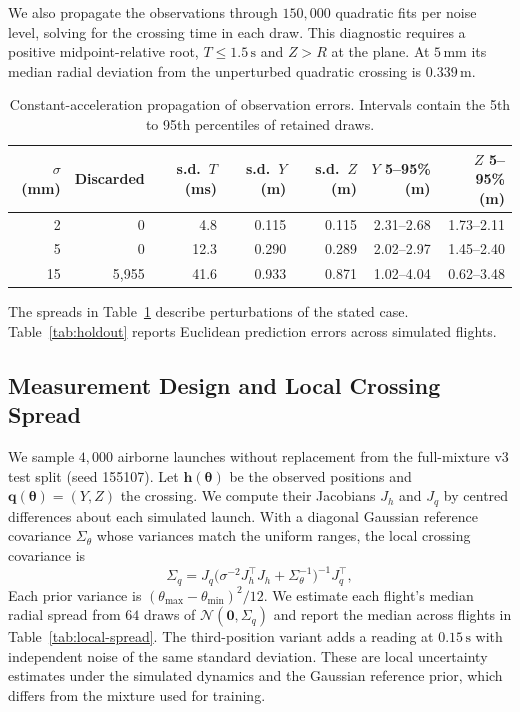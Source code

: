 \documentclass[11pt,a4paper]{article}
\begin{document}
We also propagate the observations through $150{,}000$ quadratic fits per noise level, solving for the crossing time in each draw. This diagnostic requires a positive midpoint-relative root, $T\le1.5\,\mathrm{s}$ and $Z>R$ at the plane. At $5\,\mathrm{mm}$ its median radial deviation from the unperturbed quadratic crossing is $0.339\,\mathrm{m}$.

\begin{table}[htbp]
  \centering
  \small
  \caption{Constant-acceleration propagation of observation errors. Intervals contain the 5th to 95th percentiles of retained draws.}
  \label{tab:noise}
  \begin{tabular}{rrrrrrr}
    \toprule
    $\sigma$ (mm) & Discarded & s.d.\ $T$ (ms) & s.d.\ $Y$ (m) & s.d.\ $Z$ (m) & $Y$ 5--95\% (m) & $Z$ 5--95\% (m) \\
    \midrule
    2  & 0     & 4.8  & 0.115 & 0.115 & 2.31--2.68 & 1.73--2.11 \\
    5  & 0     & 12.3 & 0.290 & 0.289 & 2.02--2.97 & 1.45--2.40 \\
    15 & 5{,}955 & 41.6 & 0.933 & 0.871 & 1.02--4.04 & 0.62--3.48 \\
    \bottomrule
  \end{tabular}
\end{table}

The spreads in Table~\ref{tab:noise} describe perturbations of the stated case. Table~\ref{tab:holdout} reports Euclidean prediction errors across simulated flights.

\subsection{Measurement Design and Local Crossing Spread}
\label{app:design}

We sample $4{,}000$ airborne launches without replacement from the full-mixture v3 test split (seed 155107). Let $\mathbf h(\boldsymbol\theta)$ be the observed positions and $\mathbf q(\boldsymbol\theta)=(Y,Z)$ the crossing. We compute their Jacobians $J_h$ and $J_q$ by centred differences about each simulated launch. With a diagonal Gaussian reference covariance $\Sigma_\theta$ whose variances match the uniform ranges, the local crossing covariance is
\begin{equation}
  \Sigma_q=J_q
  \bigl(\sigma^{-2}J_h^\top J_h+\Sigma_\theta^{-1}\bigr)^{-1}
  J_q^\top ,
  \label{eq:local-cov}
\end{equation}
Each prior variance is $(\theta_{\max}-\theta_{\min})^2/12$. We estimate each flight's median radial spread from $64$ draws of $\mathcal N(\mathbf 0,\Sigma_q)$ and report the median across flights in Table~\ref{tab:local-spread}. The third-position variant adds a reading at $0.15\,\mathrm{s}$ with independent noise of the same standard deviation. These are local uncertainty estimates under the simulated dynamics and the Gaussian reference prior, which differs from the mixture used for training.
\end{document}
